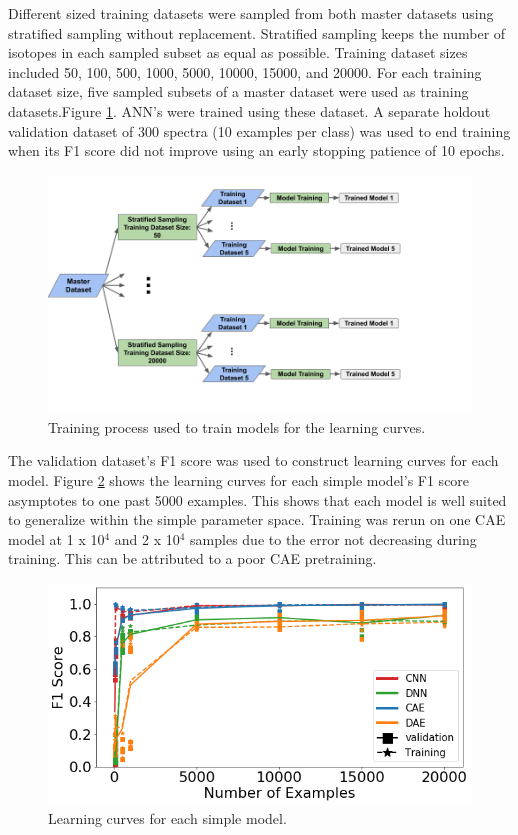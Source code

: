 Different sized training datasets were sampled from both master datasets using stratified sampling without replacement. Stratified sampling keeps the number of isotopes in each sampled subset as equal as possible. Training dataset sizes included 50, 100, 500, 1000, 5000, 10000, 15000, and 20000. For each training dataset size, five sampled subsets of a master dataset were used as training datasets.Figure \ref{fig:learning_curve_training_diagram}. ANN's were trained using these dataset. A separate holdout validation dataset of 300 spectra (10 examples per class) was used to end training when its F1 score did not improve using an early stopping patience of 10 epochs.

\begin{figure}[H]
	\centering
	\includegraphics[trim=0 70 160 0,clip,width=1.0\linewidth]{images/learning_curve_training_diagram}
	\caption{Training process used to train models for the learning curves.}
	\label{fig:learning_curve_training_diagram}
\end{figure}

The validation dataset's F1 score was used to construct learning curves for each model. Figure \ref{fig:learning_curves_easy} shows the learning curves for each simple model's F1 score asymptotes to one past 5000 examples. This shows that each model is well suited to generalize within the simple parameter space. Training was rerun on one CAE model at 1 x 10$^{4}$ and 2 x 10$^{4}$ samples due to the error not decreasing during training. This can be attributed to a poor CAE pretraining.


\begin{figure}[H]
	\centering
	\includegraphics[width=0.9\linewidth]{images/learning_curves_easy}
	\caption{Learning curves for each simple model.}
	\label{fig:learning_curves_easy}
\end{figure}


